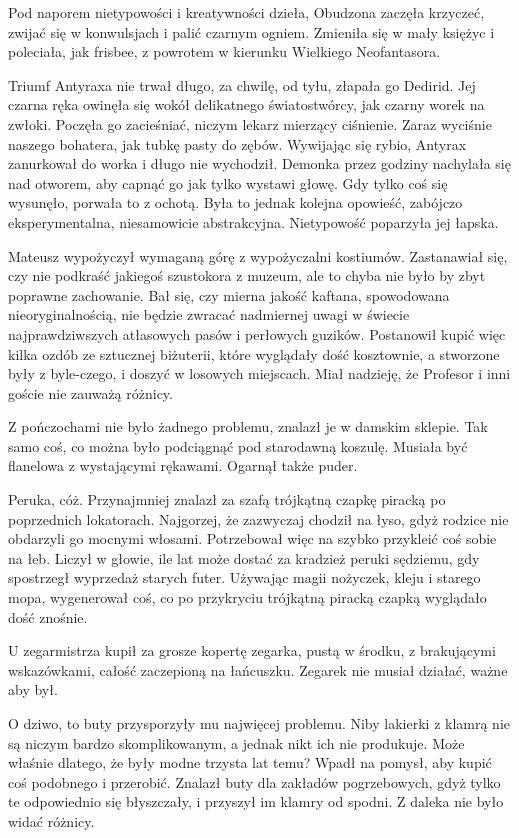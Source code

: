 \divider{}

Pod naporem nietypowości i kreatywności dzieła, Obudzona zaczęła krzyczeć, zwijać się w konwulsjach i palić czarnym ogniem.
Zmieniła się w mały księżyc i poleciała, jak frisbee, z powrotem w kierunku Wielkiego Neofantasora.

Triumf Antyraxa nie trwał długo, za chwilę, od tyłu, złapała go Dedirid.
Jej czarna ręka owinęła się wokół delikatnego światostwórcy, jak czarny worek na zwłoki.
Poczęła go zacieśniać, niczym lekarz mierzący ciśnienie.
Zaraz wyciśnie naszego bohatera, jak tubkę pasty do zębów.
Wywijając się rybio, Antyrax zanurkował do worka i długo nie wychodził.
Demonka przez godziny nachylała się nad otworem, aby capnąć go jak tylko wystawi głowę.
Gdy tylko coś się wysunęło, porwała to z ochotą.
Była to jednak kolejna opowieść, zabójczo eksperymentalna, niesamowicie abstrakcyjna.
Nietypowość poparzyła jej łapska.

\divider{}

Mateusz wypożyczył wymaganą górę z wypożyczalni kostiumów.
Zastanawiał się, czy nie podkraść jakiegoś szustokora z muzeum, ale to chyba nie było by zbyt poprawne zachowanie.
Bał się, czy mierna jakość kaftana, spowodowana nieoryginalnością, nie będzie zwracać nadmiernej uwagi w świecie najprawdziwszych atłasowych pasów i perłowych guzików.
Postanowił kupić więc kilka ozdób ze sztucznej biżuterii, które wyglądały dość kosztownie, a stworzone były z
byle-czego, i doszyć w losowych miejscach. Miał nadzieję, że Profesor i inni goście nie zauważą różnicy.

Z pończochami nie było żadnego problemu, znalazł je w damskim sklepie.
Tak samo coś, co można było podciągnąć pod starodawną koszulę.
Musiała być flanelowa z wystającymi rękawami.
Ogarnął także puder.

Peruka, cóż. Przynajmniej znalazł za szafą trójkątną czapkę piracką po poprzednich lokatorach.
Najgorzej, że zazwyczaj chodził na łyso, gdyż rodzice nie obdarzyli go mocnymi włosami.
Potrzebował więc na szybko przykleić coś sobie na łeb.
Liczył w głowie, ile lat może dostać za kradzież peruki sędziemu, gdy spostrzegł wyprzedaż starych futer.
Używając magii nożyczek, kleju i starego mopa, wygenerował coś, co po przykryciu trójkątną piracką czapką wyglądało dość znośnie.

U zegarmistrza kupił za grosze kopertę zegarka, pustą w środku, z brakującymi wskazówkami, całość zaczepioną na łańcuszku.
Zegarek nie musiał działać, ważne aby był.

O dziwo, to buty przysporzyły mu najwięcej problemu.
Niby lakierki z klamrą nie są niczym bardzo skomplikowanym, a jednak nikt ich nie produkuje.
Może właśnie dlatego, że były modne trzysta lat temu?
Wpadł na pomysł, aby kupić coś podobnego i przerobić.
Znalazł buty dla zakładów pogrzebowych, gdyż tylko te odpowiednio się błyszczały, i przyszył im klamry od spodni.
Z daleka nie było widać różnicy.

